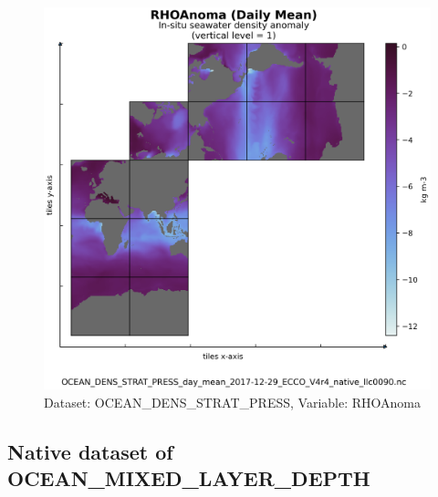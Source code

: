 \begin{figure}[H]
\centering
\includegraphics[scale=0.55]{../images/plots/native_plots/Ocean_Density_Stratification_and_Hydrostatic_Pressure/RHOAnoma.png}
\caption{Dataset: OCEAN\_DENS\_STRAT\_PRESS, Variable: RHOAnoma}
\label{tab:table-OCEAN_DENS_STRAT_PRESS_RHOAnoma-Plot}
\end{figure}
\newpage
\subsection{Native dataset of OCEAN\_MIXED\_LAYER\_DEPTH}
\newp
